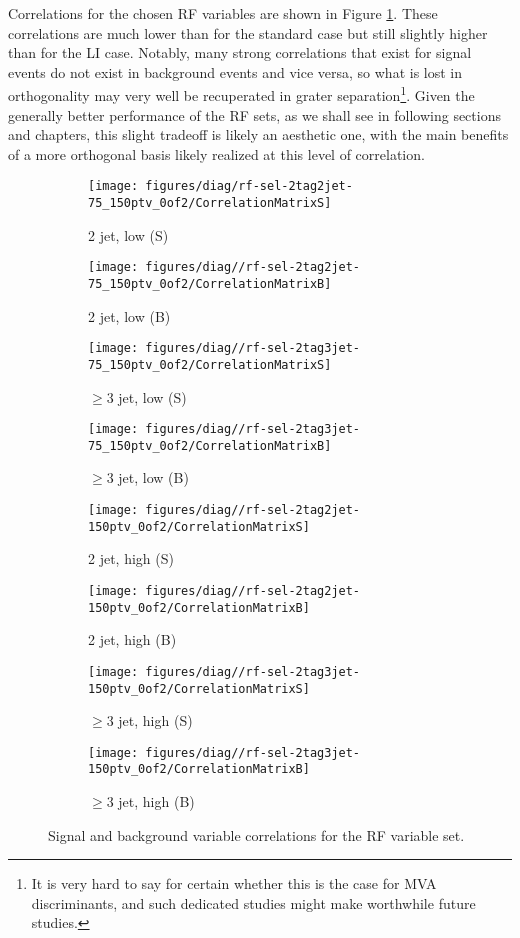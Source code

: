 Correlations for the chosen RF variables are shown in Figure \ref{fig:rf-sel-Correlations}.  These correlations are much lower than for the standard case but still slightly higher than for the LI case.  Notably, many strong correlations that exist for signal events do not exist in background events and vice versa, so what is lost in orthogonality may very well be recuperated in grater separation\footnote{It is very hard to say for certain whether this is the case for MVA discriminants, and such dedicated studies might make worthwhile future studies.}.  Given the generally better performance of the RF sets, as we shall see in following sections and chapters, this slight tradeoff is likely an aesthetic one, with the main benefits of a more orthogonal basis likely realized at this level of correlation.

\begin{figure}[!htbp]\captionsetup{justification=centering}
  \centering
\begin{subfigure}[t]{0.220000\textwidth}\centering\texttt{[image: figures/diag/rf-sel-2tag2jet-75\_150ptv\_0of2/CorrelationMatrixS]}\caption{2 jet, low \ptv (S)}\end{subfigure}
\begin{subfigure}[t]{0.220000\textwidth}\centering\texttt{[image: figures/diag//rf-sel-2tag2jet-75\_150ptv\_0of2/CorrelationMatrixB]}\caption{2 jet, low \ptv (B)}\end{subfigure}
\begin{subfigure}[t]{0.220000\textwidth}\centering\texttt{[image: figures/diag//rf-sel-2tag3jet-75\_150ptv\_0of2/CorrelationMatrixS]}\caption{$\ge3$ jet, low \ptv (S)}\end{subfigure}
\begin{subfigure}[t]{0.220000\textwidth}\centering\texttt{[image: figures/diag//rf-sel-2tag3jet-75\_150ptv\_0of2/CorrelationMatrixB]}\caption{$\ge3$ jet, low \ptv (B)}\end{subfigure}
\begin{subfigure}[t]{0.220000\textwidth}\centering\texttt{[image: figures/diag//rf-sel-2tag2jet-150ptv\_0of2/CorrelationMatrixS]}\caption{2 jet, high \ptv (S)}\end{subfigure}
\begin{subfigure}[t]{0.220000\textwidth}\centering\texttt{[image: figures/diag//rf-sel-2tag2jet-150ptv\_0of2/CorrelationMatrixB]}\caption{2 jet, high \ptv (B)}\end{subfigure}
\begin{subfigure}[t]{0.220000\textwidth}\centering\texttt{[image: figures/diag//rf-sel-2tag3jet-150ptv\_0of2/CorrelationMatrixS]}\caption{$\ge3$ jet, high \ptv (S)}\end{subfigure}
\begin{subfigure}[t]{0.220000\textwidth}\centering\texttt{[image: figures/diag//rf-sel-2tag3jet-150ptv\_0of2/CorrelationMatrixB]}\caption{$\ge3$ jet, high \ptv (B)}\end{subfigure}
  \caption{Signal and background variable correlations for the RF variable set.}
  \label{fig:rf-sel-Correlations}
\end{figure}

